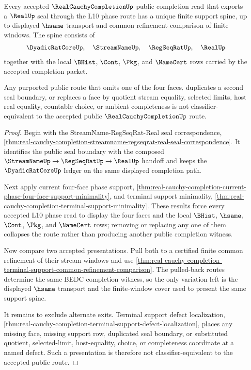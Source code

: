 \begin{theorem}
\label{thm:real-cauchy-completion-four-face-exit-uniqueness}
Every accepted $\RealCauchyCompletionUp$ public completion read that exports a $\RealUp$ seal through the L10 phase route has a unique finite support spine, up to displayed $\hsame$ transport and common-refinement comparison of finite windows. The spine consists of
$$
\DyadicRatCoreUp,\quad \StreamNameUp,\quad \RegSeqRatUp,\quad \RealUp
$$
together with the local $\BHist$, $\Cont$, $\Pkg$, and $\NameCert$ rows carried by the accepted completion packet.

Any purported public route that omits one of the four faces, duplicates a second seal boundary, or replaces a face by quotient stream equality, selected limits, host real equality, countable choice, or ambient completeness is not classifier-equivalent to the accepted public $\RealCauchyCompletionUp$ route.
\end{theorem}
\begin{proof}
Begin with the StreamName-RegSeqRat-Real seal correspondence, \autoref{thm:real-cauchy-completion-streamname-regseqrat-real-seal-correspondence}. It identifies the public seal boundary with the composed $\StreamNameUp \to \RegSeqRatUp \to \RealUp$ handoff and keeps the $\DyadicRatCoreUp$ ledger on the same displayed completion path.

Next apply current four-face phase support, \autoref{thm:real-cauchy-completion-current-phase-four-face-support-minimality}, and terminal support minimality, \autoref{thm:real-cauchy-completion-terminal-support-minimality}. These results force every accepted L10 phase read to display the four faces and the local $\BHist$, $\hsame$, $\Cont$, $\Pkg$, and $\NameCert$ rows; removing or replacing any one of them collapses the route rather than producing another public completion witness.

Now compare two accepted presentations. Pull both to a certified finite common refinement of their stream windows and use \autoref{thm:real-cauchy-completion-terminal-support-common-refinement-comparison}. The pulled-back routes determine the same BEDC completion witness, so the only variation left is the displayed $\hsame$ transport and the finite-window cover used to present the same support spine.

It remains to exclude alternate exits. Terminal support defect localization, \autoref{thm:real-cauchy-completion-terminal-support-defect-localization}, places any missing face, missing support row, duplicated seal boundary, or substituted quotient, selected-limit, host-equality, choice, or completeness coordinate at a named defect. Such a presentation is therefore not classifier-equivalent to the accepted public route.
\end{proof}

